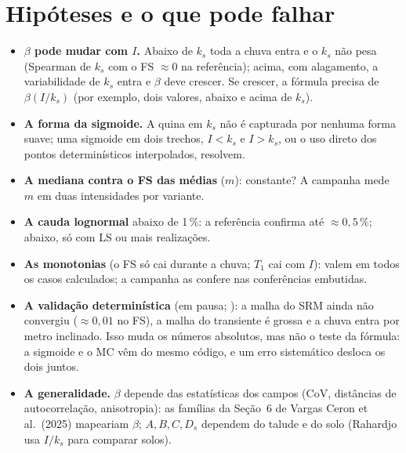 \documentclass[11pt,a4paper]{article}
\begin{document}
\section{Hipóteses e o que pode falhar}\label{sec:riscos}
\begin{itemize}
  \item \textbf{$\beta$ pode mudar com $I$.} Abaixo de $k_s$ toda a chuva entra e o $k_s$ não pesa (Spearman de $k_s$
    com o FS $\approx 0$ na referência); acima, com alagamento, a variabilidade de $k_s$ entra e $\beta$ deve crescer.
    Se crescer, a fórmula precisa de $\beta(I/k_s)$ (por exemplo, dois valores, abaixo e acima de $k_s$).
  \item \textbf{A forma da sigmoide.} A quina em $k_s$ não é capturada por nenhuma forma suave; uma sigmoide em dois
    trechos, $I < k_s$ e $I > k_s$, ou o uso direto dos pontos determinísticos interpolados, resolvem.
  \item \textbf{A mediana contra o FS das médias} ($m$): constante? A campanha mede $m$ em duas intensidades por
    variante.
  \item \textbf{A cauda lognormal} abaixo de 1\,\%: a referência confirma até $\approx 0{,}5\,\%$; abaixo, só com LS ou
    mais realizações.
  \item \textbf{As monotonias} (o FS só cai durante a chuva; $T_1$ cai com $I$): valem em todos os casos calculados; a
    campanha as confere nas conferências embutidas.
  \item \textbf{A validação determinística} (em pausa; ): a malha do SRM ainda não
    convergiu ($\approx 0{,}01$ no FS), a malha do transiente é grossa e a chuva entra por metro inclinado. Isso muda
    os números absolutos, mas não o teste da fórmula: a sigmoide e o MC vêm do mesmo código, e um erro sistemático
    desloca os dois juntos.
  \item \textbf{A generalidade.} $\beta$ depende das estatísticas dos campos (CoV, distâncias de autocorrelação,
    anisotropia): as famílias da Seção~6 de Vargas Ceron et al.\ (2025) mapeariam $\beta$; $A, B, C, D_s$ dependem do
    talude e do solo (Rahardjo usa $I/k_s$ para comparar solos).
\end{itemize}
\end{document}
